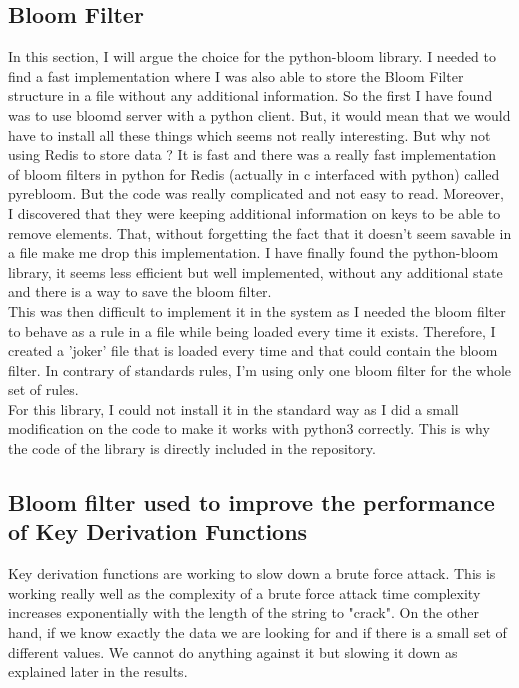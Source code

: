 \documentclass{eplmastersthesis}
\begin{document}
\subsection{Bloom Filter}
In this section, I will argue the choice for the python-bloom library. I needed to find a fast implementation where I was also able to store the Bloom Filter structure in a file without any additional information.
So the first I have found was to use bloomd server with a python client. But, it would mean that we would have to install all these things which seems not really interesting. But why not using Redis to store data ? It is fast and there was a really fast implementation of bloom filters in python for Redis (actually in c interfaced with python) called pyrebloom. But the code was really complicated and not easy to read. Moreover, I discovered that they were keeping additional information on keys to be able to remove elements. That, without forgetting the fact that it doesn't seem savable in a file make me drop this implementation.
I have finally found the python-bloom library, it seems less efficient but well implemented, without any additional state and there is a way to save the bloom filter.\\

This was then difficult to implement it in the system as I needed the bloom filter to behave as a rule in a file while being loaded every time it exists. Therefore, I created a 'joker' file that is loaded every time and that could contain the bloom filter.
In contrary of standards rules, I'm using only one bloom filter for the whole set of rules.\\

For this library, I could not install it in the standard way as I did a small modification on the code to make it works with python3 correctly. This is why the code of the library is directly included in the repository.


\subsection{Bloom filter used to improve the performance of Key Derivation Functions}
Key derivation functions are working to slow down a brute force attack. This is working really well as the complexity of a brute force attack time complexity increases exponentially with the length of the string to "crack". On the other hand, if we know exactly the data we are looking for and if there is a small set of different values. We cannot do anything against it but slowing it down as explained later in the results. \\
\end{document}
